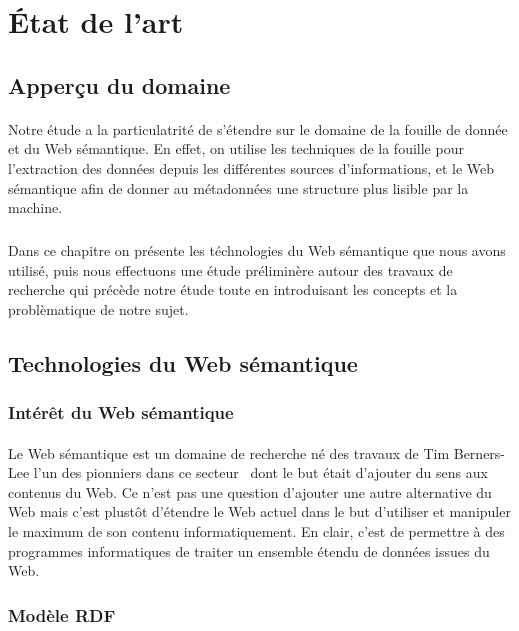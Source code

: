 \documentclass[12pt,a4	]{report}
\begin{document}
 



\section*{État de l'art}
\subsection*{Apperçu du domaine}
\paragraph{}
Notre étude a la particulatrité de s'étendre sur le domaine de la fouille de donnée et du Web sémantique.
En effet, on utilise les techniques de la fouille pour l'extraction des données depuis les différentes sources d'informations, et le Web sémantique afin de donner au métadonnées une structure plus lisible par la machine.
\subparagraph{}
Dans ce chapitre on présente les téchnologies du Web sémantique que nous avons utilisé, puis nous effectuons une étude préliminère autour des travaux de recherche qui précède notre étude toute en introduisant les concepts et la problèmatique de notre sujet.
\subsection*{Technologies du Web sémantique}
\subsubsection*{Intérêt du Web sémantique}
\paragraph{}
Le Web sémantique est un domaine de recherche né des travaux de Tim Berners-Lee l'un des pionniers dans ce secteur~\cite{Berners-lee2001} dont le but était d'ajouter du sens aux contenus du Web. Ce n'est pas une question d'ajouter une autre alternative du Web mais c'est plustôt d'étendre le Web actuel dans le but d'utiliser et manipuler le maximum de son contenu informatiquement. En clair, c'est de permettre à des programmes informatiques de traiter un ensemble étendu de données issues du Web.
\subsubsection*{Modèle RDF}
\end{document}
